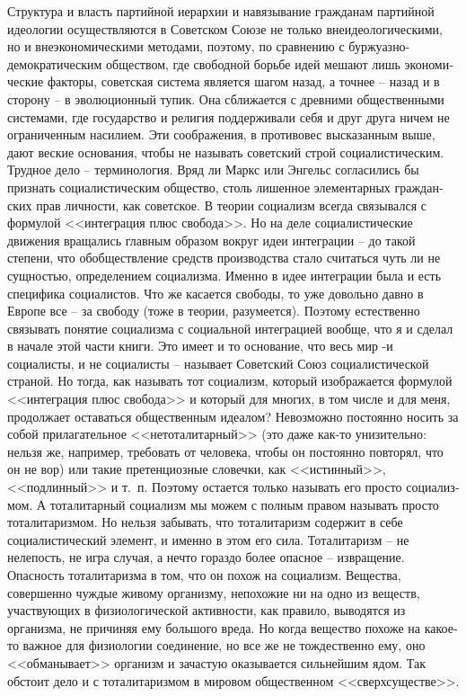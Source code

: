 \documentclass{book}
\begin{document}
Структура и власть партийной иерархии и навязывание граж­данам партийной идеологии осуществляются в Советском Союзе не только внеидеологическими, но и внеэкономическими мето­дами, поэтому, по сравнению с буржуазно-демократическим обществом, где свободной борьбе идей мешают лишь экономи­ческие факторы, советская система является шагом назад, а точнее -- назад и в сторону -- в эволюционный тупик. Она сбли­жается с древними общественными системами, где государст­во и религия поддерживали себя и друг друга ничем не огра­ниченным насилием. Эти соображения, в противовес высказан­ным выше, дают веские основания, чтобы не называть совет­ский строй социалистическим. Трудное дело -- терминология. Вряд ли Маркс или Энгельс согласились бы признать социали­стическим общество, столь лишенное элементарных граждан­ских прав личности, как советское. В теории социализм всегда связывался с формулой <<интеграция плюс свобода>>. Но на де­ле социалистические движения вращались главным образом вокруг идеи интеграции -- до такой 
степени, что обобществле­ние средств производства стало считаться чуть ли не сущностью, определением социализма. Именно в идее интеграции была и есть специфика социалистов. Что же касается свободы, то уже довольно давно в Европе все -- за свободу (тоже в теории, разумеется). Поэтому естественно связывать понятие социализма с социальной интеграцией вообще, что я и сделал в нача­ле этой части книги. Это имеет и то основание, что весь мир -и социалисты, и не социалисты -- называет Советский Союз социалистической страной. Но тогда, как называть тот социа­лизм, который изображается формулой <<интеграция плюс сво­бода>> и который для многих, в том числе и для меня, продол­жает оставаться общественным идеалом? Невозможно постоян­но носить за собой прилагательное <<нетоталитарный>> (это да­же как-то унизительно: нельзя же, например, требовать от че­ловека, чтобы он постоянно повторял, что он не вор) или та­кие претенциозные словечки, как <<истинный>>, <<подлинный>> и т.~п. Поэтому остается только называть его просто 
социализ­мом. А тоталитарный социализм мы можем с полным правом называть просто тоталитаризмом. Но нельзя забывать, что тоталитаризм содержит в себе социалистический элемент, и именно в этом его сила. Тоталитаризм -- не нелепость, не игра случая, а нечто гораздо более опасное -- извращение. Опасность тоталитаризма в том, что он похож на социализм.  Вещества, совершенно чуждые живому организму, непохожие ни на одно из веществ, участвующих в физиологической активности, как правило, выводятся из организма, не причиняя ему большого вреда. Но когда вещество похоже на какое-то важное для фи­зиологии соединение, но все же не тождественно ему, оно <<об­манывает>> организм и зачастую оказывается сильнейшим ядом. Так обстоит дело и с тоталитаризмом в мировом общественном <<сверхсуществе>>.
\end{document}

